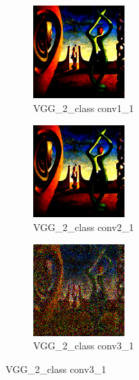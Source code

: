 \documentclass[twocolumn]{article}
\begin{document}
\begin{figure}[H]
  \centering
  \begin{subfigure}[b]{0.3\textwidth}
  \centering
    \includegraphics[width=3.5cm]{images/2_reconstructed_layer_0.png}
    \caption{VGG\_2\_class conv1\_1}
    \label{fig:image1}
  \end{subfigure}
  \hfill
  \begin{subfigure}[b]{0.3\textwidth}
  \centering
    \includegraphics[width=3.5cm]{images/2_reconstructed_layer_5.png}
    \caption{VGG\_2\_class conv2\_1}
    \label{fig:image2}
  \end{subfigure}
  \hfill
  \begin{subfigure}[b]{0.3\textwidth}
  \centering
    \includegraphics[width=3.5cm]{images/2_reconstructed_layer_10.png}
    \caption{VGG\_2\_class conv3\_1}
    \label{fig:image3}
  \end{subfigure}


\end{figure}
\end{document}
